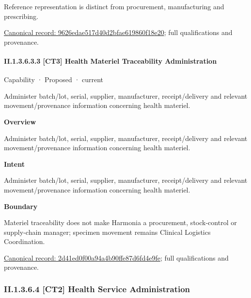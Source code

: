 Reference representation is distinct from procurement, manufacturing and prescribing.


{\footnotesize \href{../../../../continuum/strategy/capability/9626edae517d40d2bfae619860f18e20.md}{Canonical record: 9626edae517d40d2bfae619860f18e20}; full qualifications and provenance.}\par
\paragraph*{II.1.3.6.3.3 [CT3] Health Materiel Traceability Administration}
\label{navigation:II.1.3.6.3.3}

\label{element:2d41ed0f00a94a4b90ffe87d6fd4e9fe}
{\small Capability · Proposed · current}\par

Administer batch/lot, serial, supplier, manufacturer, receipt/delivery and relevant movement/provenance information concerning health materiel.



\textbf{Overview}



Administer batch/lot, serial, supplier, manufacturer, receipt/delivery and relevant movement/provenance information concerning health materiel.



\textbf{Intent}



Administer batch/lot, serial, supplier, manufacturer, receipt/delivery and relevant movement/provenance information concerning health materiel.



\textbf{Boundary}



Materiel traceability does not make Harmonia a procurement, stock-control or supply-chain manager; specimen movement remains Clinical Logistics Coordination.


{\footnotesize \href{../../../../continuum/strategy/capability/2d41ed0f00a94a4b90ffe87d6fd4e9fe.md}{Canonical record: 2d41ed0f00a94a4b90ffe87d6fd4e9fe}; full qualifications and provenance.}\par
\subsubsection*{II.1.3.6.4 [CT2] Health Service Administration}
\label{navigation:II.1.3.6.4}

